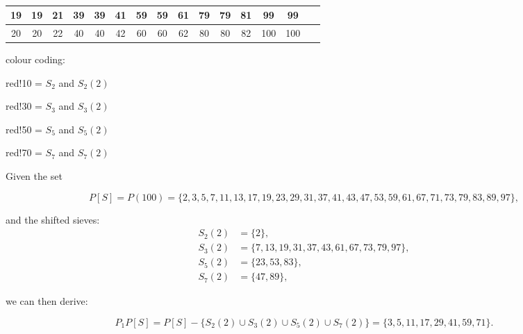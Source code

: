 \documentclass{aomart}
\begin{document}
\begin{table}[H]
\begin{adjustbox}{max width=\textwidth}
\begin{tabular}{|c|c|c!{\vrule width 1.5pt}c|c|c!{\vrule width 2pt}c|c|c!{\vrule width 1.5pt}c|c|c!{\vrule width 1.5pt}c|c|c|}
 19 & 19 &  21 &  39 &  39 & 41 & 59 & 59 & 61 &  79 & 79 &  81 &  99 &  99 &   \\ \hline
{} 20 &  20 &  22 &  40 &  40 &  42 &  60 &  60 &  62 &  80 &  80 &  82 &  100 &  100 &   \\ \hline
\end{tabular}
\end{adjustbox}
\caption{}
\end{table}

colour coding:

red!10 = \( S_{2} \) and \( S_{2}(2) \)

\vspace{1\baselineskip}

red!30 = \( S_{3} \) and \( S_{3}(2) \)

\vspace{1\baselineskip}

red!50 = \( S_{5} \) and \( S_{5}(2) \)

\vspace{1\baselineskip}

red!70 = \( S_{7} \) and \( S_{7}(2) \) 


\vspace{2\baselineskip}


Given the set 

\begin{equation}
P[S] = P(100) = \{ 2,3,5,7,11,13,17,19,23,29,31,37,41,43,47,53,59,61,67,71,73,79,83,89,97\} ,
\end{equation}

and the shifted sieves:
\begin{align*}
S_{2}(2) & = \{ 2\}, \\
S_{3}(2) & = \{ 7,13,19,31,37,43,61,67,73,79, 97\}, \\
S_{5}(2) & = \{ 23, 53,83\}, \\
S_{7}(2) & = \{ 47,89\},
\end{align*}

we can then derive:

\begin{equation}
P_{1}P[S] = P[S] - \{ S_{2}(2) \cup S_{3}(2) \cup S_{5}(2) \cup S_{7}(2)\} = \{ 3, 5, 11, 17, 29, 41, 59, 71\}.
\end{equation}
\vspace{1\baselineskip}
\end{document}
